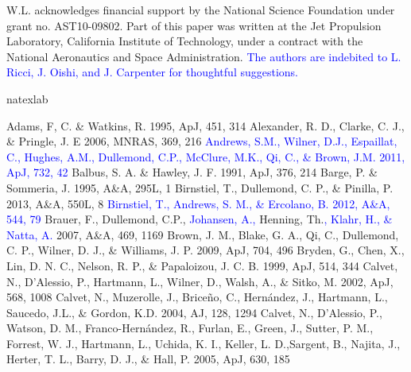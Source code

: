 \documentclass[apj]{emulateapj}
\def\blue#1{\textcolor{blue}{#1}}
\begin{document}
\acknowledgments W.L. acknowledges financial support by the National Science
Foundation under grant no. AST10-09802. Part of this paper was written
at the Jet Propulsion Laboratory, California Institute of Technology, under a contract with the
National Aeronautics and Space Administration. \blue{The authors are
  indebited to L. Ricci,  J. Oishi, and J. Carpenter for thoughtful suggestions.} 

\begin{thebibliography}{}
\expandafter\ifx\csname natexlab\endcsname\relax\def\natexlab#1{#1}\fi

 Adams, F, C. \& Watkins, R. 1995, ApJ, 451, 314
 Alexander, R. D., Clarke, C. J., \& Pringle, J. E 2006, MNRAS, 369, 216
\bibitem[{{\blue{Andrews et al.}}(2011)}]{Andrews11} \blue{Andrews, S.M., Wilner, D.J., Espaillat, C., Hughes, A.M., Dullemond, C.P., McClure, M.K., Qi, C., \& Brown, J.M. 2011, ApJ, 732, 42} 
 Balbus, S. A. \&  Hawley, J. F. 1991, ApJ, 376, 214
 Barge, P. \&  Sommeria, J. 1995, A\&A, 295L, 1
 Birnstiel, T., Dullemond, C. P., \& Pinilla, P. 2013, A\&A, 550L, 8
\bibitem[{{\blue{Birnstiel et al.}}(2012)}]{Birnstiel12} \blue{Birnstiel, T., Andrews, S. M., \& Ercolano, B. 2012, A\&A, 544, 79}
 Brauer, F., Dullemond, C.P., \blue{Johansen, A.,} Henning, Th.\blue{, Klahr, H., \& Natta, A.} 2007, A\&A, 469, 1169
 Brown, J. M., Blake, G. A., Qi, C., Dullemond, C. P., Wilner, D. J., \& Williams, J. P. 2009, ApJ, 704, 496
 Bryden, G., Chen, X., Lin, D. N. C., Nelson, R. P., \& Papaloizou, J. C. B. 1999, ApJ, 514, 344
 Calvet, N., D'Alessio, P., Hartmann, L., Wilner, D., Walsh, A., \& Sitko, M. 2002, ApJ, 568, 1008
 Calvet, N., Muzerolle, J., Brice\~no, C.,  Hern\'andez, J., Hartmann, L., Saucedo, J.L., \& Gordon, K.D. 2004, AJ, 128, 1294
 Calvet, N., D'Alessio, P., Watson, D. M., Franco-Hern\'andez, R., Furlan, E., Green, J., Sutter, P. M., Forrest, W. J., Hartmann, L., Uchida, K. I., Keller, L. D.,Sargent, B., Najita, J., Herter, T. L., Barry, D. J., \& Hall, P. 2005, ApJ, 630, 185

\end{thebibliography}
\end{document}
